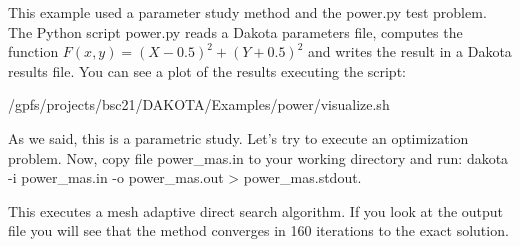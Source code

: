 \documentclass[12pt,a4paper,article]{memoir}
\begin{document}
This example used a parameter study method and the power.py test problem. The Python script power.py reads a Dakota parameters file, computes the function $F(x,y)=(X-0.5)^2+(Y+0.5)^2$ and writes the result in a Dakota results file. You can see a plot of the results executing the script:

/gpfs/projects/bsc21/DAKOTA/Examples/power/visualize.sh

As we said, this is a parametric study. Let's try to execute an optimization problem. Now, copy file power\_mas.in to your working directory and run: dakota -i  power\_mas.in -o power\_mas.out \textgreater{} power\_mas.stdout.

This executes a mesh adaptive direct search algorithm. If you look at the output file you will see that the method converges in 160 iterations to the exact solution.
\end{document}
